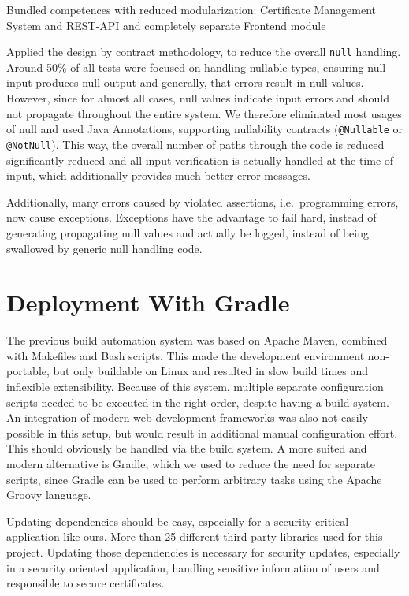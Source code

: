 Bundled competences with reduced modularization: Certificate Management System and REST-API and completely separate Frontend module

Applied the design by contract methodology, to reduce the overall \lstinline{null} handling.
Around 50\% of all tests were focused on handling nullable types, ensuring null input produces null output and
generally, that errors result in null values.
However, since for almost all cases, null values indicate input errors and should not propagate throughout the entire
system.
We therefore eliminated most usages of null and used Java Annotations, supporting nullability contracts
(\lstinline{@Nullable} or \lstinline{@NotNull}).
This way, the overall number of paths through the code is reduced significantly reduced and all input verification is
actually handled at the time of input, which additionally provides much better error messages.

Additionally, many errors caused by violated assertions, i.e.\ programming errors, now cause exceptions.
Exceptions have the advantage to fail hard, instead of generating propagating null values and actually be logged,
instead of being swallowed by generic null handling code.

\section{Deployment With Gradle}\label{sec:deploymentWithGradle}
The previous build automation system was based on Apache Maven, combined with Makefiles and Bash scripts.
This made the development environment non-portable, but only buildable on Linux and resulted in slow build times and
inflexible extensibility.
Because of this system, multiple separate configuration scripts needed to be executed in the right order, despite having
a build system.
An integration of modern web development frameworks was also not easily possible in this setup, but would result in
additional manual configuration effort.
This should obviously be handled via the build system. %
A more suited and modern alternative is Gradle, which we used to reduce the need for separate scripts, since Gradle can
be used to perform arbitrary tasks using the Apache Groovy language.

Updating dependencies should be easy, especially for a security-critical application like ours.
More than 25 different third-party libraries used for this project.
Updating those dependencies is necessary for security updates, especially in a security oriented application, handling
sensitive information of users and responsible to secure certificates.

